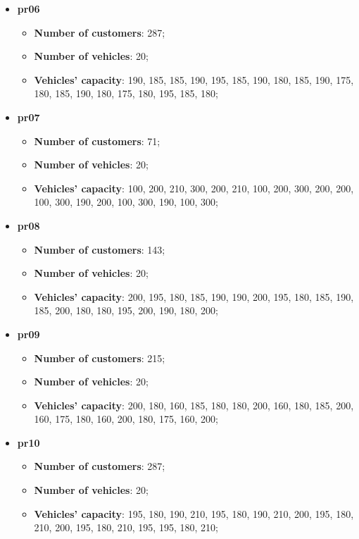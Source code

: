 \documentclass[../main.tex]{subfiles}
\begin{document}
\begin{itemize}
    \item \textbf{pr06}
        \begin{itemize}
            \item \textbf{Number of customers}: 287;
            \item \textbf{Number of vehicles}: 20;
            \item \textbf{Vehicles' capacity}: 190, 185, 185, 190, 195, 185, 190, 180, 185, 190, 175, 180, 185, 190, 180, 175, 180, 195, 185, 180;
        \end{itemize}

    \item \textbf{pr07}
        \begin{itemize}
            \item \textbf{Number of customers}: 71;
            \item \textbf{Number of vehicles}: 20;
            \item \textbf{Vehicles' capacity}: 100, 200, 210, 300, 200, 210, 100, 200, 300, 200, 200, 100, 300, 190, 200, 100, 300, 190, 100, 300;
        \end{itemize}

    \item \textbf{pr08}
        \begin{itemize}
            \item \textbf{Number of customers}: 143;
            \item \textbf{Number of vehicles}: 20;
            \item \textbf{Vehicles' capacity}: 200, 195, 180, 185, 190, 190, 200, 195, 180, 185, 190, 185, 200, 180, 180, 195, 200, 190, 180, 200;
        \end{itemize}

    \item \textbf{pr09}
        \begin{itemize}
            \item \textbf{Number of customers}: 215;
            \item \textbf{Number of vehicles}: 20;
            \item \textbf{Vehicles' capacity}: 200, 180, 160, 185, 180, 180, 200, 160, 180, 185, 200, 160, 175, 180, 160, 200, 180, 175, 160, 200;
        \end{itemize}

    \item \textbf{pr10}
        \begin{itemize}
            \item \textbf{Number of customers}: 287;
            \item \textbf{Number of vehicles}: 20;
            \item \textbf{Vehicles' capacity}: 195, 180, 190, 210, 195, 180, 190, 210, 200, 195, 180, 210, 200, 195, 180, 210, 195, 195, 180, 210;
        \end{itemize}


\end{itemize}
\end{document}
